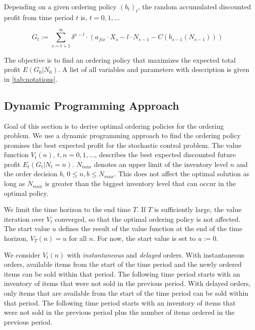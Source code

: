 Depending on a given ordering policy $(b_t)_t$, the random accumulated discounted profit from time period $t$ is, $t = 0, 1, \ldots$

$$
G_t := \sum_{s=t+1}^{\infty} \delta^{s-t} \cdot (a_{fix} \cdot X_s - l \cdot N_{s-1} - C(b_{s-1}(N_{s-1})))
$$

The objective is to find an ordering policy that maximizes the expected total profit $E(G_0 | N_0)$.
A list of all variables and parameters with description is given in \cref{tab:notations}.


\subsection{Dynamic Programming Approach}
\label{section:ordering_solution}

Goal of this section is to derive optimal ordering policies for the ordering problem.
We use a dynamic programming approach to find the ordering policy promises the best expected profit for the stochastic control problem.
The value function $V_t(n)$, $t, n = 0, 1, \ldots$, describes the best expected discounted future profit $E_t(G_t | N_t=n)$.
$N_{max}$ denotes an upper limit of the inventory level $n$ and the order decision $b$, $0 \leq n, b \leq N_{max}$. This does not affect the optimal solution as long as $N_{max}$ is greater than the biggest inventory level that can occur in the optimal policy.

We limit the time horizon to the end time $T$.
If $T$ is sufficiently large, the value iteration over $V_t$ converged, so that the optimal ordering policy is not affected.
The start value $u$ defines the result of the value function at the end of the time horizon, $V_T(n) = u$ for all $n$.
For now, the start value is set to $u := 0$.

We consider $V_t(n)$ with \textit{instantaneous} and \textit{delayed} orders.
With instantaneous orders, available items from the start of the time period and the newly ordered items can be sold within that period.
The following time period starts with an inventory of items that were not sold in the previous period.
With delayed orders, only items that are available from the start of the time period can be sold within that period.
The following time period starts with an inventory of items that were not sold in the previous period plus the number of items ordered in the previous period.

